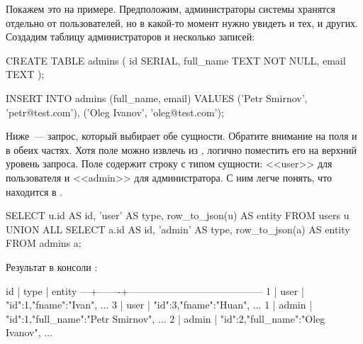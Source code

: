 Покажем это на примере. Предположим, администраторы системы хранятся отдельно от пользователей, но в какой-то момент нужно увидеть и тех, и других. Создадим таблицу администраторов и несколько записей:

\begin{english}
  \begin{sql}
CREATE TABLE admins (
  id SERIAL,
  full_name TEXT NOT NULL,
  email TEXT
);

INSERT INTO admins (full_name, email)
VALUES ('Petr Smirnov', 'petr@test.com'),
       ('Oleg Ivanov', 'oleg@test.com');
  \end{sql}
\end{english}

Ниже~--- запрос, который выбирает обе сущности. Обратите внимание на поля  и  в обеих частях. Хотя поле  можно извлечь из , логично поместить его на верхний уровень запроса. Поле  содержит строку с типом сущности: <<user>> для пользователя и <<admin>> для администратора. С ним легче понять, что находится в .

\begin{english}
  \begin{sql}
SELECT
  u.id AS id,
  'user' AS type,
  row_to_json(u) AS entity
FROM
  users u
UNION ALL
SELECT
  a.id AS id,
  'admin' AS type,
  row_to_json(a) AS entity
FROM
  admins a;
  \end{sql}
\end{english}

Результат в консоли :



\begin{english}
  \begin{text}
id | type  |                 entity
---+-------+-----------------------------------------
 1 | user  | {"id":1,"fname":"Ivan", ...}
 3 | user  | {"id":3,"fname":"Huan", ...}
 1 | admin | {"id":1,"full_name":"Petr Smirnov", ...}
 2 | admin | {"id":2,"full_name":"Oleg Ivanov", ...}
  \end{text}
\end{english}

